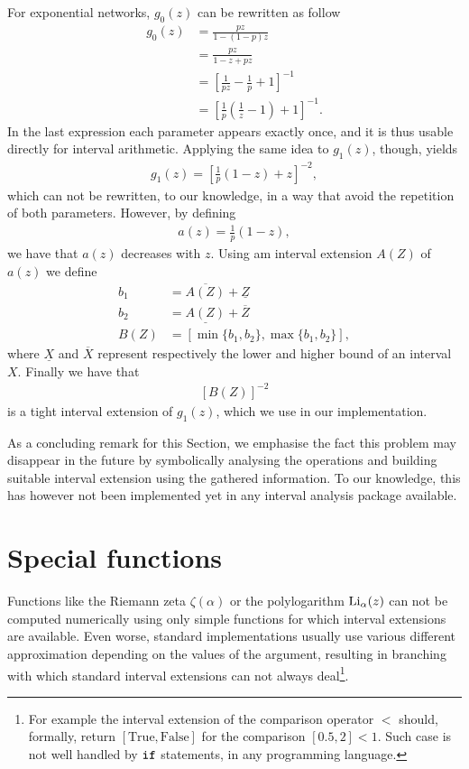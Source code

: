 \documentclass[
11pt, %
english, %
singlespacing, %
nolistspacing, %
liststotoc, %
headsepline, %
]{MastersDoctoralThesis} %
\begin{document}
For exponential networks, $g_0(z)$ can be rewritten as follow
\begin{align}
	g_0(z) &= \frac{p z}{1 - (1 - p)z} \\
		&= \frac{p z}{1 - z + pz} \\
		&= \left[\frac{1}{pz} - \frac{1}{p} + 1\right]^{-1} \\
		&= \left[\frac{1}{p} \left(\frac{1}{z} - 1\right) + 1\right]^{-1}.
\end{align}
In the last expression each parameter appears exactly once, and it is thus usable directly for interval arithmetic. Applying the same idea to $g_1(z)$, though, yields
\begin{align}
	g_1(z) = \left[\frac{1}{p}(1 - z) + z\right]^{-2},
\end{align}
which can not be rewritten, to our knowledge, in a way that avoid the repetition of both parameters. However, by defining
\begin{align}
	a(z) = \frac{1}{p}(1 - z),
\end{align}
we have that $a(z)$ decreases with $z$. Using am interval extension $A(Z)$ of $a(z)$ we define
\begin{align}
	b_1 &= \overline{A(Z)} + \underline{Z} \\
	b_2 &= \underline{A(Z)} + \overline{Z} \\
	B(Z) &= [\min \{b_1, b_2\}, \max \{b_1, b_2\}],
\end{align}
where $\underline{X}$ and $\overline{X}$ represent respectively the lower and higher bound of an interval $X$. Finally we have that
\begin{align}
	\left[B(Z)\right]^{-2}
\end{align}
is a tight interval extension of $g_1(z)$, which we use in our implementation.

As a concluding remark for this Section, we emphasise the fact this problem may disappear in the future by symbolically analysing the operations and building suitable interval extension using the gathered information. To our knowledge, this has however not been implemented yet in any interval analysis package available.


\section{Special functions}

Functions like the Riemann zeta $\zeta(\alpha)$ or the polylogarithm $\mathrm{Li}_{\alpha}\!\left(z\right)$ can not be computed numerically using only simple functions for which interval extensions are available. Even worse, standard implementations usually use various different approximation depending on the values of the argument, resulting in branching with which standard interval extensions can not always deal\footnote{For example the interval extension of the comparison operator $<$ should, formally, return $[\text{True}, \text{False}]$ for the comparison $[0.5, 2] < 1$. Such case is not well handled by $\texttt{if}$ statements, in any programming language.}.
\end{document}

